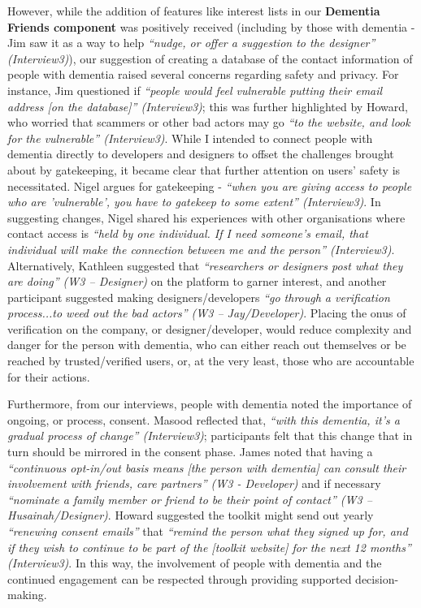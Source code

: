 However, while the addition of features like interest lists in our \textbf{Dementia Friends component} was positively received (including by those with dementia - Jim saw it as a way to help \textit{``nudge, or offer a suggestion to the designer'' (Interview3)}), our suggestion of creating a database of the contact information of people with dementia raised several concerns regarding safety and privacy. For instance, Jim questioned if \textit{``people would feel vulnerable putting their email address [on the database]'' (Interview3)}; this was further highlighted by Howard, who worried that scammers or other bad actors may go \textit{``to the website, and look for the vulnerable'' (Interview3)}. While I intended to connect people with dementia directly to developers and designers to offset the challenges brought about by gatekeeping, it became clear that further attention on users’ safety is necessitated. Nigel argues for gatekeeping - \textit{``when you are giving access to people who are 'vulnerable', you have to gatekeep to some extent'' (Interview3)}. In suggesting changes, Nigel shared his experiences with other organisations where contact access is \textit{``held by one individual. If I need someone's email, that individual will make the connection between me and the person'' (Interview3)}. Alternatively, Kathleen suggested that \textit{``researchers or designers post what they are doing'' (W3 – Designer)} on the platform to garner interest, and another participant suggested making designers/developers \textit{``go through a verification process...to weed out the bad actors'' (W3 – Jay/Developer)}. Placing the onus of verification on the company, or designer/developer, would reduce complexity and danger for the person with dementia, who can either reach out themselves or be reached by trusted/verified users, or, at the very least, those who are accountable for their actions. 

Furthermore, from our interviews, people with dementia noted the importance of ongoing, or process, consent. Masood reflected that, \textit{``with this dementia, it's a gradual process of change'' (Interview3)}; participants felt that this change that in turn should be mirrored in the consent phase. James noted that having a \textit{``continuous opt-in/out basis means [the person with dementia] can consult their involvement with friends, care partners'' (W3 - Developer)} and if necessary \textit{``nominate a family member or friend to be their point of contact'' (W3 – Husainah/Designer)}. Howard suggested the toolkit might send out yearly \textit{``renewing consent emails''} that \textit{``remind the person what they signed up for, and if they wish to continue to be part of the [toolkit website] for the next 12 months'' (Interview3)}. In this way, the involvement of people with dementia and the continued engagement can be respected through providing supported decision-making. 

